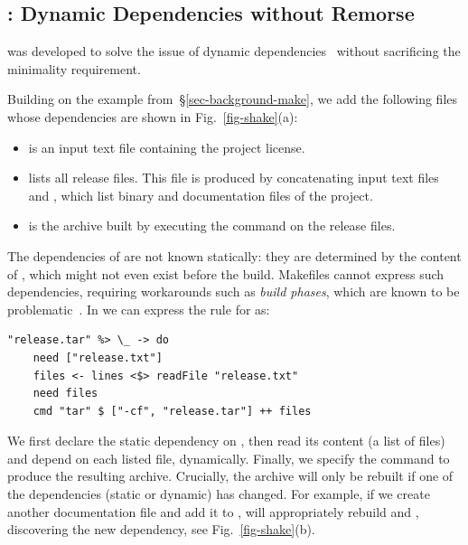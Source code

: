 \subsection{\Shake: Dynamic Dependencies without Remorse}
\label{sec-background-shake}

\Shake was developed to solve the issue of dynamic
dependencies~\cite{mitchell2012shake} without sacrificing
the minimality requirement.

Building on the \Make example
from~\S\ref{sec-background-make}, we add the following files whose
dependencies are shown in Fig.~\ref{fig-shake}(a):

\begin{itemize}
    \item {} is an input text file containing the project license.
    \item {} lists all release files. This file is produced by
    concatenating input text files  and , which list
    binary and documentation files of the project.
    \item {} is the archive built by executing the command
     on the release files.
\end{itemize}

The dependencies of  are not known statically: they are
determined by the content of , which might not even exist
before the build. Makefiles cannot express such dependencies, requiring
workarounds such as \emph{build phases}, which are known to be
problematic~\cite{hadrian}. In \Shake we can express the rule for
 as:

\vspace{1mm}
\begin{verbatim}
"release.tar" %> \_ -> do
    need ["release.txt"]
    files <- lines <$> readFile "release.txt"
    need files
    cmd "tar" $ ["-cf", "release.tar"] ++ files
\end{verbatim}
\vspace{1mm}

\noindent
We first declare the static dependency on , then read its
content (a list of files) and depend on each listed file, dynamically. Finally,
we specify the
command to produce the resulting archive. Crucially, the archive will only be
rebuilt if one of the dependencies (static or dynamic) has changed. For example,
if we create another documentation file  and add it to
, \Shake will appropriately rebuild  and
, discovering the new dependency, see Fig.~\ref{fig-shake}(b).

